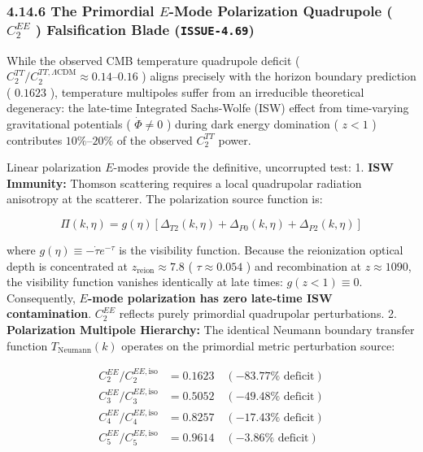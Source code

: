 \documentclass[11pt,a4paper]{article}
\theoremstyle{definition}\newtheorem{definition}{Definition}
\theoremstyle{remark}\newtheorem{remark}{Remark}
\begin{document}
\subsubsection{4.14.6 The Primordial $E$-Mode Polarization Quadrupole ( $C_2^{EE}$ ) Falsification Blade (\texttt{ISSUE-4.69})}

While the observed CMB temperature quadrupole deficit ( $C_2^{TT} / C_2^{TT, \Lambda\text{CDM}} \approx 0.14\text{--}0.16$ ) aligns precisely with the horizon boundary prediction ( $0.1623$ ), temperature multipoles suffer from an irreducible theoretical degeneracy: the late-time Integrated Sachs-Wolfe (ISW) effect from time-varying gravitational potentials ( $\dot{\Phi} \neq 0$ ) during dark energy domination ( $z < 1$ ) contributes $10\%\text{--}20\%$ of the observed $C_2^{TT}$ power.

Linear polarization $E$-modes provide the definitive, uncorrupted test:
1. \textbf{ISW Immunity:} Thomson scattering requires a local quadrupolar radiation anisotropy at the scatterer. The polarization source function is:


\begin{equation}
\Pi(k, \eta) = g(\eta) \left[ \Delta_{T2}(k, \eta) + \Delta_{P0}(k, \eta) + \Delta_{P2}(k, \eta) \right]
\end{equation}


where $g(\eta) \equiv -\dot{\tau} e^{-\tau}$ is the visibility function. Because the reionization optical depth is concentrated at $z_{\text{reion}} \approx 7.8$ ( $\tau \approx 0.054$ ) and recombination at $z \approx 1090$, the visibility function vanishes identically at late times: $g(z < 1) \equiv 0$. Consequently, \textbf{$E$-mode polarization has zero late-time ISW contamination}. $C_2^{EE}$ reflects purely primordial quadrupolar perturbations.
2. \textbf{Polarization Multipole Hierarchy:} The identical Neumann boundary transfer function $T_{\text{Neumann}}(k)$ operates on the primordial metric perturbation source:


\begin{equation}
\begin{aligned}
C_2^{EE} / C_2^{EE, \text{iso}} &= 0.1623 \quad (-83.77\% \text{ deficit}) \\
C_3^{EE} / C_3^{EE, \text{iso}} &= 0.5052 \quad (-49.48\% \text{ deficit}) \\
C_4^{EE} / C_4^{EE, \text{iso}} &= 0.8257 \quad (-17.43\% \text{ deficit}) \\
C_5^{EE} / C_5^{EE, \text{iso}} &= 0.9614 \quad (-3.86\% \text{ deficit})
\end{aligned}
\end{equation}
\end{document}
